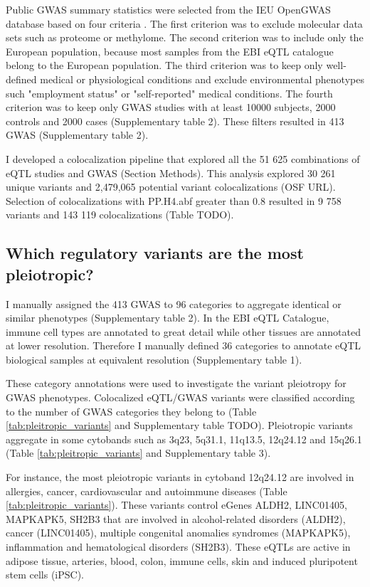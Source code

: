 Public GWAS summary statistics were selected from the IEU OpenGWAS database based on four criteria \citep{2018.Parkinson.Buniello}.
%
The first criterion was to exclude molecular data sets such as proteome or methylome.
%	
The second criterion was to include only the European population, because most samples from the EBI eQTL catalogue belong to the European population.
%
The third criterion was to keep only well-defined medical or physiological conditions and exclude environmental phenotypes such "employment status" or "self-reported" medical conditions.
%
The fourth criterion was to keep only GWAS studies with at least 10000 subjects, 2000 controls and 2000 cases (Supplementary table 2).
%
These filters resulted in 413 GWAS (Supplementary table 2).

I developed a colocalization pipeline that explored all the 51 625 combinations of eQTL studies and GWAS (Section Methods).
%
This analysis explored 30 261 unique variants and 2,479,065 potential variant colocalizations (OSF URL).
%
Selection of colocalizations with PP.H4.abf greater than 0.8 resulted in 9 758 variants and 143 119 colocalizations (Table TODO).

\subsection*{Which regulatory variants are the most pleiotropic?}

I manually assigned the 413 GWAS to 96 categories to aggregate identical or similar phenotypes (Supplementary table 2).
%
In the EBI eQTL Catalogue, immune cell types are annotated to great detail while other tissues are annotated at lower resolution.
%
Therefore I manually defined 36 categories to annotate eQTL biological samples at equivalent resolution (Supplementary table 1).

These category annotations were used to investigate the variant pleiotropy for GWAS phenotypes.
%
Colocalized eQTL/GWAS variants were classified according to the number of GWAS categories they belong to (Table \ref{tab:pleitropic_variants} and Supplementary table TODO).
%
Pleiotropic variants aggregate in some cytobands such as 3q23, 5q31.1, 11q13.5, 12q24.12 and 15q26.1 (Table \ref{tab:pleitropic_variants} and Supplementary table 3).

For instance, the most pleiotropic variants in cytoband 12q24.12 are involved in allergies, cancer, cardiovascular and autoimmune diseases (Table \ref{tab:pleitropic_variants}).
%
These variants control eGenes ALDH2, LINC01405, MAPKAPK5, SH2B3 that are involved in alcohol-related disorders (ALDH2), cancer (LINC01405), multiple congenital anomalies syndromes (MAPKAPK5),  inflammation and hematological disorders (SH2B3).
%
These eQTLs are active in adipose tissue, arteries, blood, colon, immune cells, skin and induced pluripotent stem cells (iPSC).


